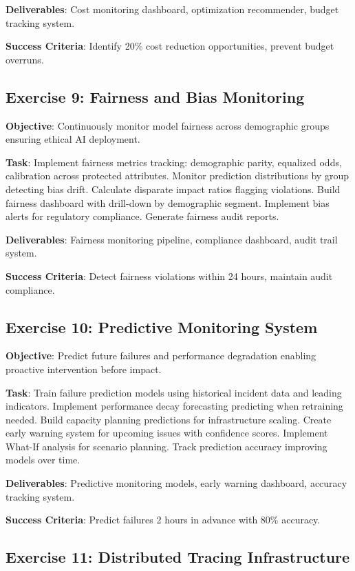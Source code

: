 \textbf{Deliverables}: Cost monitoring dashboard, optimization recommender, budget tracking system.

\textbf{Success Criteria}: Identify 20\% cost reduction opportunities, prevent budget overruns.

\subsection{Exercise 9: Fairness and Bias Monitoring}

\textbf{Objective}: Continuously monitor model fairness across demographic groups ensuring ethical AI deployment.

\textbf{Task}: Implement fairness metrics tracking: demographic parity, equalized odds, calibration across protected attributes. Monitor prediction distributions by group detecting bias drift. Calculate disparate impact ratios flagging violations. Build fairness dashboard with drill-down by demographic segment. Implement bias alerts for regulatory compliance. Generate fairness audit reports.

\textbf{Deliverables}: Fairness monitoring pipeline, compliance dashboard, audit trail system.

\textbf{Success Criteria}: Detect fairness violations within 24 hours, maintain audit compliance.

\subsection{Exercise 10: Predictive Monitoring System}

\textbf{Objective}: Predict future failures and performance degradation enabling proactive intervention before impact.

\textbf{Task}: Train failure prediction models using historical incident data and leading indicators. Implement performance decay forecasting predicting when retraining needed. Build capacity planning predictions for infrastructure scaling. Create early warning system for upcoming issues with confidence scores. Implement What-If analysis for scenario planning. Track prediction accuracy improving models over time.

\textbf{Deliverables}: Predictive monitoring models, early warning dashboard, accuracy tracking system.

\textbf{Success Criteria}: Predict failures 2 hours in advance with 80\% accuracy.

\subsection{Exercise 11: Distributed Tracing Infrastructure}

